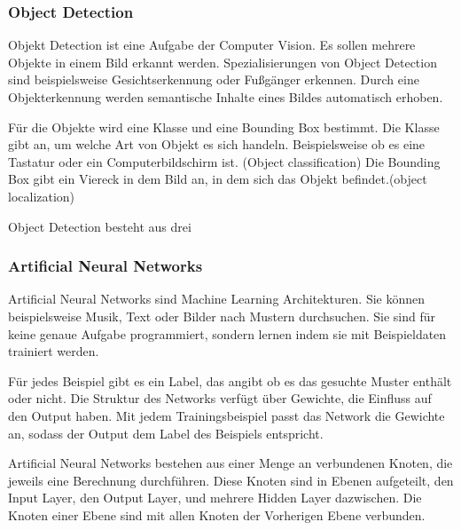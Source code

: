 %
%
%
%


\subsubsection{Object Detection}

Objekt Detection ist eine Aufgabe der Computer Vision. Es sollen mehrere Objekte in einem Bild erkannt werden. Spezialisierungen von Object Detection sind beispielsweise Gesichtserkennung oder Fußgänger erkennen. Durch eine Objekterkennung werden semantische Inhalte eines Bildes automatisch erhoben. 

Für die Objekte wird eine Klasse und eine Bounding Box bestimmt. 
Die Klasse gibt an, um welche Art von Objekt es sich handeln. Beispielsweise ob es eine Tastatur oder ein Computerbildschirm ist. (Object classification)
Die Bounding Box gibt ein Viereck in dem Bild an, in dem sich das Objekt befindet.(object localization)

Object Detection besteht aus drei 




\subsubsection{Artificial Neural Networks}
Artificial Neural Networks sind Machine Learning Architekturen. Sie können beispielsweise Musik, Text oder Bilder nach Mustern durchsuchen. Sie sind für keine genaue Aufgabe programmiert, sondern lernen indem sie mit Beispieldaten trainiert werden. 

Für jedes Beispiel gibt es ein Label, das angibt ob es das gesuchte Muster enthält oder nicht. Die Struktur des Networks verfügt über Gewichte, die Einfluss auf den Output haben. Mit jedem Trainingsbeispiel passt das Network die Gewichte an, sodass der Output dem Label des Beispiels entspricht.\citep{introToCNN,surveyOfDeepLearing}

Artificial Neural Networks bestehen aus einer Menge an verbundenen Knoten, die jeweils eine Berechnung durchführen. Diese Knoten sind in Ebenen aufgeteilt, den Input Layer, den Output Layer, und mehrere Hidden Layer dazwischen. Die Knoten einer Ebene sind mit allen Knoten der Vorherigen Ebene verbunden.\citep{introToCNN,surveyOfDeepLearing}

